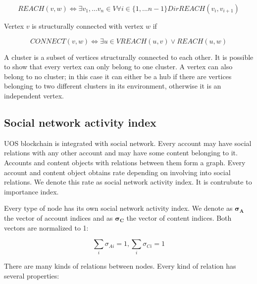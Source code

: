 \documentclass[a4paper,12pt]{article}
\begin{document}

$$
REACH(v,w) \Leftrightarrow \exists v_1,...v_n \in V \forall i \in \{1,...n-1\}DirREACH(v_i,v_{i+1})
$$

Vertex $v$ is structurally connected with vertex $w$ if


$$
CONNECT(v,w) \Leftrightarrow \exists u \in V REACH(u,v) \vee REACH(u,w)
$$

A cluster is a subset of vertices structurally connected to each other. It is possible to show that every vertex can only belong to one cluster. A vertex can also belong to no cluster; in this case it can either be a hub if there are vertices belonging to two different clusters in its environment, otherwise it is an independent vertex.


\subsection{Social network activity index}

U{\degree}OS blockchain is integrated with social network. Every account may have social relations with any other account and may have some content belonging to it. Accounts and content objects with relations between them form a graph. Every account and content object obtains rate depending on involving into social relations. We denote this rate as social network activity index. It is contrubute to importance index.

Every type of node has its own social network activity index. We denote as $\boldsymbol{\sigma_A}$ the vector of account indices and as $\boldsymbol{\sigma_C}$ the vector of content indices. Both vectors are normalized to 1:

$$
\sum_i{\sigma_{Ai}} = 1, \sum_i{\sigma_{Ci}} = 1
$$

There are many kinds of relations between nodes. Every kind of relation has several properties:
\end{document}
